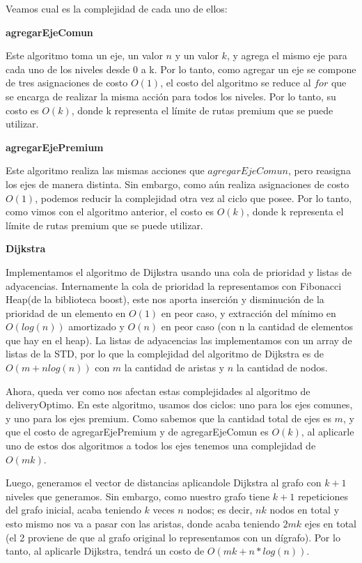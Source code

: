 Veamos cual es la complejidad de cada uno de ellos:

\begin{center}
	\textbf{agregarEjeComun}
\end{center}

Este algoritmo toma un eje, un valor $n$ y un valor $k$, y agrega el mismo eje para cada uno de los niveles desde 0 a k. Por lo tanto, como agregar un eje se compone de tres asignaciones de costo $O(1)$, el costo del algoritmo se reduce al $for$ que se encarga de realizar la misma acción para todos los niveles. Por lo tanto, su costo es $O(k)$, donde k representa el límite de rutas premium que se puede utilizar.

\begin{center}
	\textbf{agregarEjePremium}
\end{center}

Este algoritmo realiza las mismas acciones que $agregarEjeComun$, pero reasigna los ejes de manera distinta. Sin embargo, como aún realiza asignaciones de costo $O(1)$, podemos reducir la complejidad otra vez al ciclo que posee. Por lo tanto, como vimos con el algoritmo anterior, el costo es $O(k)$, donde k representa el límite de rutas premium que se puede utilizar.

\begin{center}
	\textbf{Dijkstra}
\end{center}

Implementamos el algoritmo de Dijkstra usando una cola de prioridad y listas de adyacencias. Internamente la cola de prioridad la representamos con Fibonacci Heap(de la biblioteca boost), este nos aporta inserción y disminución de la prioridad de un elemento en $O(1)$ en peor caso, y extracción del mínimo en $O(log(n))$ amortizado y $O(n)$ en peor caso (con n la cantidad de elementos que hay en el heap). La listas de adyacencias las implementamos con un array de listas de la STD, por lo que la complejidad del algoritmo de Dijkstra es de $O(m + n log(n))$ con $m$ la cantidad de aristas y $n$ la cantidad de nodos.\bigskip

Ahora, queda ver como nos afectan estas complejidades al algoritmo de deliveryOptimo. En este algoritmo, usamos dos ciclos: uno para los ejes comunes, y uno para los ejes premium. Como sabemos que la cantidad total de ejes es $m$, y que el costo de agregarEjePremium y de agregarEjeComun es $O(k)$, al aplicarle uno de estos dos algoritmos a todos los ejes tenemos una complejidad de $O(mk)$.

Luego, generamos el vector de distancias aplicandole Dijkstra al grafo con $k+1$ niveles que generamos. Sin embargo, como nuestro grafo tiene $k+1$ repeticiones del grafo inicial, acaba teniendo $k$ veces $n$ nodos; es decir, $nk$ nodos en total y esto mismo nos va a pasar con las aristas, donde acaba teniendo $2mk$ ejes en total (el 2 proviene de que al grafo original lo representamos con un dígrafo). Por lo tanto, al aplicarle Dijkstra, tendrá un costo de $O(mk + n * log(n))$.

